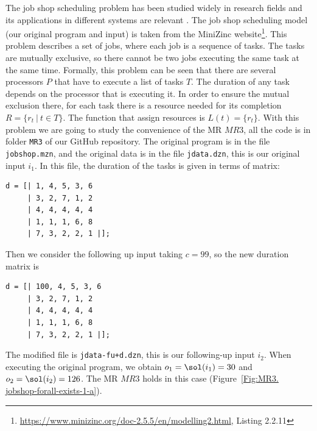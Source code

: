The job shop scheduling problem has been studied widely in research fields \cite{xiong2022survey} and its applications in different systems are relevant
\cite{fernandes2022energy,coelho2021thirty}.
The job shop scheduling model (our original program and input) is
taken from the MiniZinc
website\footnote{\url{https://www.minizinc.org/doc-2.5.5/en/modelling2.html},
  Listing 2.2.11}.
This problem describes a set of jobs, where each job is a sequence of tasks. The
tasks are mutually exclusive, so there cannot be two jobs executing the
same task at the same time. Formally, this problem can be seen that
there are several processors $P$ that have to execute a list of tasks
$T$.
The duration of any task depends on the processor that is executing it.
In
order to ensure the mutual exclusion there, for each task there is a
resource needed for its completion
$R=\{r_{t}\ |\ t\in T \}$. The function that assign resources is
$L(t)=\{r_{t}\}$.
With this problem we are going to study the convenience of the
MR $MR3$, all the code is in folder \lstinline|MR3| of
our GitHub repository. The original program is in the file
\lstinline|jobshop.mzn|, and the original data is in the file
\lstinline|jdata.dzn|, this is our original input $i_{1}$.
In this file, the duration of the tasks is
given in terms of matrix:
\begin{lstlisting}
d = [| 1, 4, 5, 3, 6
     | 3, 2, 7, 1, 2
     | 4, 4, 4, 4, 4
     | 1, 1, 1, 6, 8
     | 7, 3, 2, 2, 1 |];
\end{lstlisting}

Then we consider the following up input taking $c=99$, so the new
duration matrix is
\begin{lstlisting}
d = [| 100, 4, 5, 3, 6
     | 3, 2, 7, 1, 2
     | 4, 4, 4, 4, 4
     | 1, 1, 1, 6, 8
     | 7, 3, 2, 2, 1 |];
\end{lstlisting}
The modified file is \lstinline|jdata-fu+d.dzn|, this is our
following-up input $i_{2}$. When executing the original program, we
obtain $o_{1}=\sol(i_{1})=30$ and $o_{2}=\sol(i_{2})=126$. The
MR $MR3$ holds in this case (Figure~\ref{Fig:MR3. jobshop-forall-exists-1-a}).


